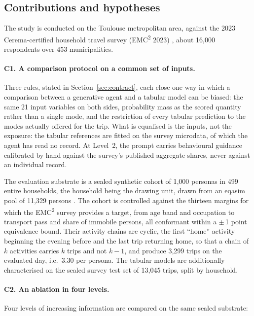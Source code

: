 \subsection{Contributions and hypotheses}
\label{sec:contributions}

The study is conducted on the Toulouse metropolitan area, against the 2023 Cerema-certified household travel survey (EMC\textsuperscript{2} 2023) \citep{tisseo2023emc2}, about 16,000 respondents over 453 municipalities.

\paragraph{C1. A comparison protocol on a common set of inputs.}
Three rules, stated in Section~\ref{sec:contract}, each close one way in which a comparison between a generative agent and a tabular model can be biased: the same 21 input variables on both sides, probability mass as the scored quantity rather than a single mode, and the restriction of every tabular prediction to the modes actually offered for the trip. What is equalised is the inputs, not the exposure: the tabular references are fitted on the survey microdata, of which the agent has read no record. At Level~2, the prompt carries behavioural guidance calibrated by hand against the survey's published aggregate shares, never against an individual record.

The evaluation substrate is a sealed synthetic cohort of 1,000 personas
in 499 entire households, the household being the drawing unit, drawn from an eqasim pool of 11,329 persons \citep{horl2021eqasim}. The cohort is controlled against the thirteen margins for which the EMC\textsuperscript{2} survey provides a target, from age band and occupation to transport pass and share of immobile persons, all conformant within a $\pm$\,1 point equivalence bound.
Their activity chains are cyclic, the first ``home'' activity beginning the evening before and the last trip returning home, so that a chain of $k$ activities carries $k$ trips and not $k-1$, and produce 3,299 trips on the evaluated day, i.e.\ 3.30 per persona.
The tabular models are additionally characterised on the sealed survey test set of 13,045 trips, split by household.

\paragraph{C2. An ablation in four levels.}
Four levels of increasing information are compared on the same sealed substrate:


